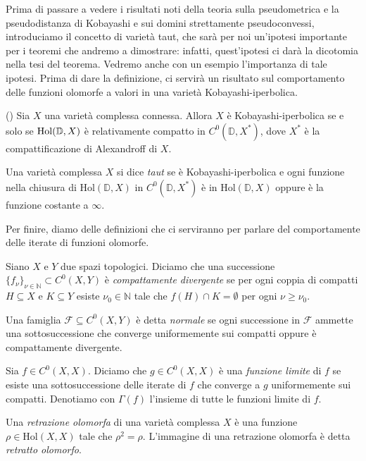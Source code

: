 Prima di passare a vedere i risultati noti della teoria sulla pseudometrica e la pseudodistanza di Kobayashi e sui domini strettamente pseudoconvessi, introduciamo il concetto di varietà taut, che sarà per noi un'ipotesi importante per i teoremi che andremo a dimostrare: infatti, quest'ipotesi ci darà la dicotomia nella tesi del teorema. Vedremo anche con un esempio l'importanza di tale ipotesi. Prima di dare la definizione, ci servirà un risultato sul comportamento delle funzioni olomorfe a valori in una varietà Kobayashi-iperbolica.

\begin{prop} \label{alex}
    (\cite[Theorem 1.3]{A3}) Sia $X$ una varietà complessa connessa. Allora $X$ è Kobayashi-iperbolica se e solo se $\text{\normalfont{Hol}}(\mathbb{D},X)$ è relativamente compatto in $C^0(\mathbb{D},X^*)$, dove $X^*$ è la compattificazione di Alexandroff di $X$.
\end{prop}

\begin{defn}
    Una varietà complessa $X$ si dice \textit{taut} se è Kobayashi-iperbolica e ogni funzione nella chiusura di $\text{Hol}(\mathbb{D},X)$ in $C^0(\mathbb{D},X^*)$ è in $\text{Hol}(\mathbb{D},X)$ oppure è la funzione costante a $\infty$.
\end{defn}

Per finire, diamo delle definizioni che ci serviranno per parlare del comportamente delle iterate di funzioni olomorfe.

\begin{defn}
    Siano $X$ e $Y$ due spazi topologici. Diciamo che una successione $\{f_{\nu}\}_{\nu \in \mathbb{N}} \subset C^0(X,Y)$ è \textit{compattamente divergente} se per ogni coppia di compatti $H\subseteq X$ e $K\subseteq Y$ esiste $\nu_0 \in \mathbb{N}$ tale che $f(H)\cap K=\emptyset$ per ogni $\nu \ge \nu_0$.

    Una famiglia $\mathcal{F} \subseteq C^0(X,Y)$ è detta \textit{normale} se ogni successione in $\mathcal{F}$ ammette una sottosuccessione che converge uniformemente sui compatti oppure è compattamente divergente.
\end{defn}

\begin{defn}
    Sia $f\in C^0(X,X)$. Diciamo che $g\in C^0(X,X)$ è una \textit{funzione limite} di $f$ se esiste una sottosuccessione delle iterate di $f$ che converge a $g$ uniformemente sui compatti. Denotiamo con $\Gamma(f)$ l'insieme di tutte le funzioni limite di $f$.
\end{defn}

\begin{defn}
    Una \textit{retrazione olomorfa} di una varietà complessa $X$ è una funzione $\rho\in\text{Hol}(X,X)$ tale che $\rho^2=\rho$. L'immagine di una retrazione olomorfa è detta \textit{retratto olomorfo}.
\end{defn}
